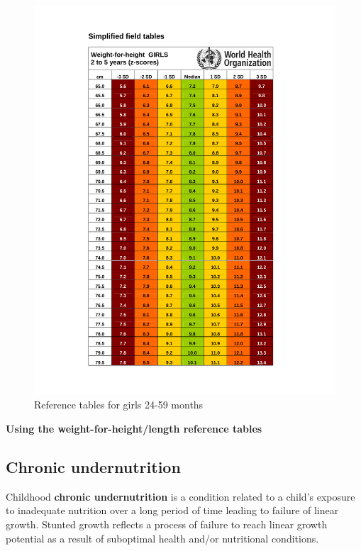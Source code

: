 \documentclass[12pt,]{book}
\theoremstyle{definition}
\theoremstyle{definition}
\theoremstyle{definition}
\theoremstyle{remark}
\let\BeginKnitrBlock\begin \let\EndKnitrBlock\end
\begin{document}
\begin{figure}[H]
{\centering \includegraphics[width=1\linewidth]{pdf/girls_24_60} 

}

\caption{Reference tables for girls 24-59 months}\label{fig:anthro14}
\end{figure}

\newpage

\BeginKnitrBlock{rmdexercise}
\textbf{Using the weight-for-height/length reference tables}
\EndKnitrBlock{rmdexercise}

\hypertarget{chronic-undernutrition}{%
\subsection{Chronic undernutrition}\label{chronic-undernutrition}}

Childhood \textbf{chronic undernutrition} is a condition related to a
child's exposure to inadequate nutrition over a long period of time
leading to failure of linear growth. Stunted growth reflects a process
of failure to reach linear growth potential as a result of suboptimal
health and/or nutritional conditions.
\end{document}
